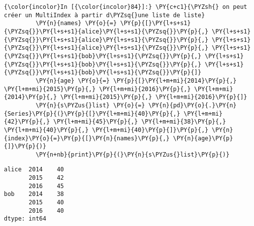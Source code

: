     \begin{Verbatim}[commandchars=\\\{\},frame=single,framerule=0.3mm,rulecolor=\color{cellframecolor}]
{\color{incolor}In [{\color{incolor}84}]:} \PY{c+c1}{\PYZsh{} on peut créer un MultiIndex à partir d\PYZsq{}une liste de liste}
         \PY{n}{names} \PY{o}{=} \PY{p}{[}\PY{l+s+s1}{\PYZsq{}}\PY{l+s+s1}{alice}\PY{l+s+s1}{\PYZsq{}}\PY{p}{,} \PY{l+s+s1}{\PYZsq{}}\PY{l+s+s1}{alice}\PY{l+s+s1}{\PYZsq{}}\PY{p}{,} \PY{l+s+s1}{\PYZsq{}}\PY{l+s+s1}{alice}\PY{l+s+s1}{\PYZsq{}}\PY{p}{,} \PY{l+s+s1}{\PYZsq{}}\PY{l+s+s1}{bob}\PY{l+s+s1}{\PYZsq{}}\PY{p}{,} \PY{l+s+s1}{\PYZsq{}}\PY{l+s+s1}{bob}\PY{l+s+s1}{\PYZsq{}}\PY{p}{,} \PY{l+s+s1}{\PYZsq{}}\PY{l+s+s1}{bob}\PY{l+s+s1}{\PYZsq{}}\PY{p}{]}
         \PY{n}{age} \PY{o}{=} \PY{p}{[}\PY{l+m+mi}{2014}\PY{p}{,} \PY{l+m+mi}{2015}\PY{p}{,} \PY{l+m+mi}{2016}\PY{p}{,} \PY{l+m+mi}{2014}\PY{p}{,} \PY{l+m+mi}{2015}\PY{p}{,} \PY{l+m+mi}{2016}\PY{p}{]}
         \PY{n}{s\PYZus{}list} \PY{o}{=} \PY{n}{pd}\PY{o}{.}\PY{n}{Series}\PY{p}{(}\PY{p}{[}\PY{l+m+mi}{40}\PY{p}{,} \PY{l+m+mi}{42}\PY{p}{,} \PY{l+m+mi}{45}\PY{p}{,} \PY{l+m+mi}{38}\PY{p}{,} \PY{l+m+mi}{40}\PY{p}{,} \PY{l+m+mi}{40}\PY{p}{]}\PY{p}{,} \PY{n}{index}\PY{o}{=}\PY{p}{[}\PY{n}{names}\PY{p}{,} \PY{n}{age}\PY{p}{]}\PY{p}{)}
         \PY{n+nb}{print}\PY{p}{(}\PY{n}{s\PYZus{}list}\PY{p}{)}
\end{Verbatim}


    \begin{Verbatim}[commandchars=\\\{\},frame=single,framerule=0.3mm,rulecolor=\color{cellframecolor}]
alice  2014    40
       2015    42
       2016    45
bob    2014    38
       2015    40
       2016    40
dtype: int64
\end{Verbatim}

